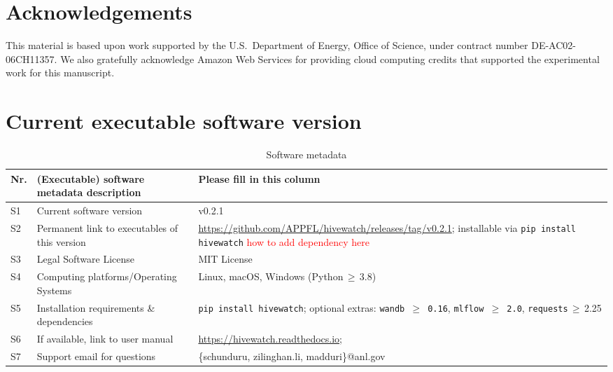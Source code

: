 \documentclass[preprint,12pt, a4paper]{elsarticle}
\begin{document}
\section*{Acknowledgements}
\label{}
This material is based upon work supported by the U.S.\ Department of Energy, Office of Science, under contract number DE-AC02-06CH11357. We also gratefully acknowledge Amazon Web Services for providing cloud computing credits that supported the experimental work for this manuscript.







\section*{Current executable software version}
\label{}

\begin{table}[!h]
\begin{tabular}{|l|p{4.5cm}|p{7.5cm}|}
\hline
\textbf{Nr.} & \textbf{(Executable) software metadata description} & \textbf{Please fill in this column} \\
\hline
S1 & Current software version & v0.2.1 \\
\hline
S2 & Permanent link to executables of this version & \url{https://github.com/APPFL/hivewatch/releases/tag/v0.2.1}; installable via \texttt{pip install hivewatch} \textcolor{red}{how to add dependency here} \\
\hline
S3 & Legal Software License & MIT License \\
\hline
S4 & Computing platforms/Operating Systems & Linux, macOS, Windows (Python\,$\geq$\,3.8) \\
\hline
S5 & Installation requirements \& dependencies & \texttt{pip install hivewatch}; optional extras: \texttt{wandb\,$\geq$\,0.16}, \texttt{mlflow\,$\geq$\,2.0}, \texttt{requests}\,$\geq$\,2.25  \\
\hline
S6 & If available, link to user manual & \url{https://hivewatch.readthedocs.io};\\
\hline
S7 & Support email for questions & \{schunduru, zilinghan.li, madduri\}@anl.gov \\
\hline
\end{tabular}
\caption{Software metadata}
\label{tab:softwaremeta}
\end{table}
\end{document}
